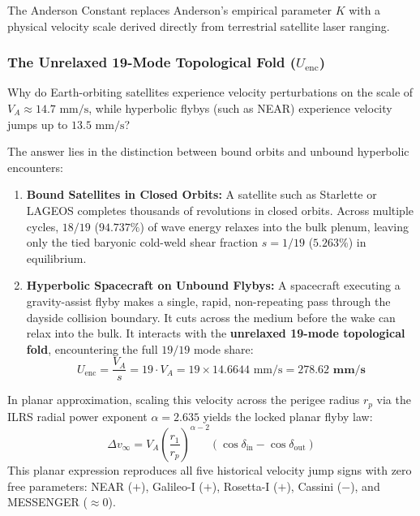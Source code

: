\documentclass[11pt,a4paper]{article}
\begin{document}
The Anderson Constant replaces Anderson's empirical parameter $K$ with a physical velocity scale derived directly from terrestrial satellite laser ranging.

\subsubsection{The Unrelaxed 19-Mode Topological Fold (\texorpdfstring{$U_{\text{enc}}$}{Uenc})}
\label{subsubsec:unrelaxed_19_fold}

Why do Earth-orbiting satellites experience velocity perturbations on the scale of $V_A \approx 14.7\text{ mm/s}$, while hyperbolic flybys (such as NEAR) experience velocity jumps up to $13.5\text{ mm/s}$?

The answer lies in the distinction between bound orbits and unbound hyperbolic encounters:
\begin{enumerate}
    \item \textbf{Bound Satellites in Closed Orbits:} A satellite such as Starlette or LAGEOS completes thousands of revolutions in closed orbits. Across multiple cycles, $18/19$ ($94.737\%$) of wave energy relaxes into the bulk plenum, leaving only the tied baryonic cold-weld shear fraction $s = 1/19$ ($5.263\%$) in equilibrium.
    \item \textbf{Hyperbolic Spacecraft on Unbound Flybys:} A spacecraft executing a gravity-assist flyby makes a single, rapid, non-repeating pass through the dayside collision boundary. It cuts across the medium before the wake can relax into the bulk. It interacts with the \textbf{unrelaxed 19-mode topological fold}, encountering the full $19/19$ mode share:
    \begin{equation}
    U_{\text{enc}} = \frac{V_A}{s} = 19 \cdot V_A = 19 \times 14.6644\text{ mm/s} = \mathbf{278.62\text{ mm/s}}
    \label{eq:u_enc_fold}
    \end{equation}
\end{enumerate}

In planar approximation, scaling this velocity across the perigee radius $r_p$ via the ILRS radial power exponent $\alpha = 2.635$ yields the locked planar flyby law:
\begin{equation}
\Delta v_\infty = V_A \left(\frac{r_1}{r_p}\right)^{\alpha - 2} (\cos\delta_{\text{in}} - \cos\delta_{\text{out}})
\label{eq:flyby_planar_law}
\end{equation}
This planar expression reproduces all five historical velocity jump signs with zero free parameters: NEAR ($+$), Galileo-I ($+$), Rosetta-I ($+$), Cassini ($-$), and MESSENGER ($\approx 0$).
\end{document}
